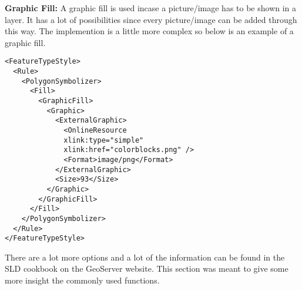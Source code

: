 \textbf{Graphic Fill:} A graphic fill is used incase a picture/image has to be shown in a layer. It has a lot of possibilities since every picture/image can be added through this way. The implemention is a little more complex so below is an example of a graphic fill. 
\begin{lstlisting}
<FeatureTypeStyle>
  <Rule>
    <PolygonSymbolizer>
      <Fill>
        <GraphicFill>
          <Graphic>
            <ExternalGraphic>
              <OnlineResource
              xlink:type="simple"
              xlink:href="colorblocks.png" />
              <Format>image/png</Format>
            </ExternalGraphic>
            <Size>93</Size>
          </Graphic>
        </GraphicFill>
      </Fill>
    </PolygonSymbolizer>
  </Rule>
</FeatureTypeStyle>
\end{lstlisting}

There are a lot more options and a lot of the information can be found in the SLD cookbook on the GeoServer website. This section was meant to give some more insight the commonly used functions.
  
